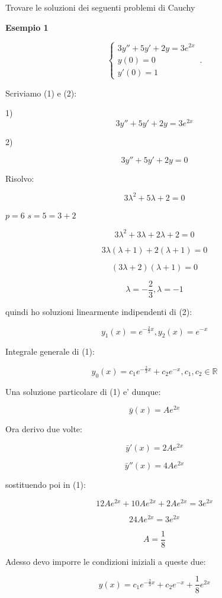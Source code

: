 \documentclass[11pt]{article}
\begin{document}
Trovare le soluzioni dei seguenti problemi di Cauchy

\textbf{Esempio 1} 

    \begin{equation}
        \begin{cases}
            3y'' + 5y' + 2y=3e ^{2x}\\
            y(0) = 0\\
            y'(0) = 1
        \end{cases}\,.
    \end{equation}

Scriviamo (1) e (2):

1)
\[
    3y''+5y'+2y = 3 e^{2x}
\]

2)

\[
    3y''+5y'+2y = 0
\]

Risolvo:

\[
    3 \lambda ^{2} + 5 \lambda + 2 = 0
\]

$p = 6$ $s=5= 3+2$ 

\[
    3 \lambda^{2} + 3 \lambda + 2 \lambda + 2 =0
\]

\[
    3 \lambda ( \lambda+1) + 2( \lambda + 1) =0
\]

\[
    (3 \lambda +2 ) ( \lambda +1 ) =0
\]

\[
    \lambda= -\frac{2}{3}, \lambda=-1
\]

quindi ho soluzioni linearmente indipendenti di (2):

\[
    y_1(x) = e ^{-\frac{2}{3}x}, y_2(x) = e ^{-x}
\]

Integrale generale di (1):

\[
    y_0(x) = c_1 e^{-\frac{2}{3}x} + c_2 e ^{-x},c_1,c_2 \in \mathbb{R}
\]


Una soluzione particolare di (1) e' dunque:

\[
    \bar{y} (x) = A e ^{2x}
\]

Ora derivo due volte:

\[
    \bar{y} '(x) = 2A e ^{2x}
\]

\[
    \bar{y} ''(x) = 4A e ^{2x}
\]

sostituendo poi in (1):

\[
    12Ae ^{2x} + 10 A e ^{2x} + 2 A e ^{2x} = 3 e^{2x}
\]

\[
    24A e ^{2x} = 3 e ^{2x}
\]

\[
    A = \frac{1}{8}
\]

Adesso devo imporre le condizioni iniziali a queste due:

\[
    y(x) = c_1 e ^{-\frac{2}{3}x} + c_2 e ^{-x}+ \frac{1}{8}e ^{2x}
\]
\end{document}
